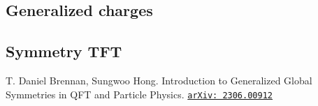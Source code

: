 \documentclass{ltjsarticle}
\theoremstyle{mystyle} %
\numberwithin{equation}{section}
\begin{document}
\subsection{Generalized charges}
\subsection{Symmetry TFT}
\begin{thebibliography}{99}
     T. Daniel Brennan, Sungwoo Hong. 
    Introduction to Generalized Global Symmetries in QFT and Particle Physics. \href{https://arxiv.org/abs/2306.00912}{\texttt{arXiv: 2306.00912}}
\end{thebibliography}
\end{document}
